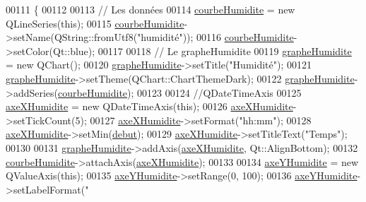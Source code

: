 \begin{DoxyCode}
00111 \{
00112 
00113     \textcolor{comment}{// Les données}
00114     \hyperlink{class_graphique_a1ff987d94beb7c471a85be00e881d64c}{courbeHumidite} = \textcolor{keyword}{new} QLineSeries(\textcolor{keyword}{this});
00115     \hyperlink{class_graphique_a1ff987d94beb7c471a85be00e881d64c}{courbeHumidite}->setName(QString::fromUtf8(\textcolor{stringliteral}{"humidité"}));
00116     \hyperlink{class_graphique_a1ff987d94beb7c471a85be00e881d64c}{courbeHumidite}->setColor(Qt::blue);
00117 
00118     \textcolor{comment}{// Le grapheHumidite}
00119     \hyperlink{class_graphique_a992da12af1bcf950a9a5fb9799b8f86b}{grapheHumidite} = \textcolor{keyword}{new} QChart();
00120     \hyperlink{class_graphique_a992da12af1bcf950a9a5fb9799b8f86b}{grapheHumidite}->setTitle(\textcolor{stringliteral}{"Humidité"});
00121     \hyperlink{class_graphique_a992da12af1bcf950a9a5fb9799b8f86b}{grapheHumidite}->setTheme(QChart::ChartThemeDark);
00122     \hyperlink{class_graphique_a992da12af1bcf950a9a5fb9799b8f86b}{grapheHumidite}->addSeries(\hyperlink{class_graphique_a1ff987d94beb7c471a85be00e881d64c}{courbeHumidite});
00123 
00124     \textcolor{comment}{//QDateTimeAxis}
00125     \hyperlink{class_graphique_a34c9e250233b7d37981cbbdcc573fe57}{axeXHumidite} = \textcolor{keyword}{new} QDateTimeAxis(\textcolor{keyword}{this});
00126     \hyperlink{class_graphique_a34c9e250233b7d37981cbbdcc573fe57}{axeXHumidite}->setTickCount(5);
00127     \hyperlink{class_graphique_a34c9e250233b7d37981cbbdcc573fe57}{axeXHumidite}->setFormat(\textcolor{stringliteral}{"hh:mm"});
00128     \hyperlink{class_graphique_a34c9e250233b7d37981cbbdcc573fe57}{axeXHumidite}->setMin(\hyperlink{class_graphique_a468d57ae7b14b46558cf25629cced7b6}{debut});
00129     \hyperlink{class_graphique_a34c9e250233b7d37981cbbdcc573fe57}{axeXHumidite}->setTitleText(\textcolor{stringliteral}{"Temps"});
00130 
00131     \hyperlink{class_graphique_a992da12af1bcf950a9a5fb9799b8f86b}{grapheHumidite}->addAxis(\hyperlink{class_graphique_a34c9e250233b7d37981cbbdcc573fe57}{axeXHumidite}, Qt::AlignBottom);
00132     \hyperlink{class_graphique_a1ff987d94beb7c471a85be00e881d64c}{courbeHumidite}->attachAxis(\hyperlink{class_graphique_a34c9e250233b7d37981cbbdcc573fe57}{axeXHumidite});
00133 
00134     \hyperlink{class_graphique_af87e1bc5874f5d633ed944205c8ba15e}{axeYHumidite} = \textcolor{keyword}{new} QValueAxis(\textcolor{keyword}{this});
00135     \hyperlink{class_graphique_af87e1bc5874f5d633ed944205c8ba15e}{axeYHumidite}->setRange(0, 100);
00136     \hyperlink{class_graphique_af87e1bc5874f5d633ed944205c8ba15e}{axeYHumidite}->setLabelFormat(\textcolor{stringliteral}{"%
}
\end{DoxyCode}
